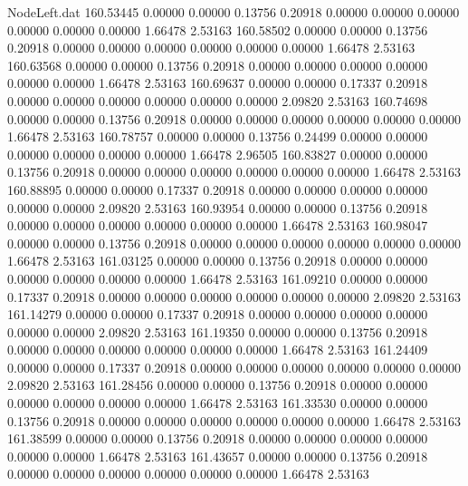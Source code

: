 \begin{filecontents}{NodeLeft.dat}
 160.53445    0.00000    0.00000     0.13756    0.20918    0.00000    0.00000    0.00000    0.00000    0.00000    0.00000    1.66478    2.53163
 160.58502    0.00000    0.00000     0.13756    0.20918    0.00000    0.00000    0.00000    0.00000    0.00000    0.00000    1.66478    2.53163
 160.63568    0.00000    0.00000     0.13756    0.20918    0.00000    0.00000    0.00000    0.00000    0.00000    0.00000    1.66478    2.53163
 160.69637    0.00000    0.00000     0.17337    0.20918    0.00000    0.00000    0.00000    0.00000    0.00000    0.00000    2.09820    2.53163
 160.74698    0.00000    0.00000     0.13756    0.20918    0.00000    0.00000    0.00000    0.00000    0.00000    0.00000    1.66478    2.53163
 160.78757    0.00000    0.00000     0.13756    0.24499    0.00000    0.00000    0.00000    0.00000    0.00000    0.00000    1.66478    2.96505
 160.83827    0.00000    0.00000     0.13756    0.20918    0.00000    0.00000    0.00000    0.00000    0.00000    0.00000    1.66478    2.53163
 160.88895    0.00000    0.00000     0.17337    0.20918    0.00000    0.00000    0.00000    0.00000    0.00000    0.00000    2.09820    2.53163
 160.93954    0.00000    0.00000     0.13756    0.20918    0.00000    0.00000    0.00000    0.00000    0.00000    0.00000    1.66478    2.53163
 160.98047    0.00000    0.00000     0.13756    0.20918    0.00000    0.00000    0.00000    0.00000    0.00000    0.00000    1.66478    2.53163
 161.03125    0.00000    0.00000     0.13756    0.20918    0.00000    0.00000    0.00000    0.00000    0.00000    0.00000    1.66478    2.53163
 161.09210    0.00000    0.00000     0.17337    0.20918    0.00000    0.00000    0.00000    0.00000    0.00000    0.00000    2.09820    2.53163
 161.14279    0.00000    0.00000     0.17337    0.20918    0.00000    0.00000    0.00000    0.00000    0.00000    0.00000    2.09820    2.53163
 161.19350    0.00000    0.00000     0.13756    0.20918    0.00000    0.00000    0.00000    0.00000    0.00000    0.00000    1.66478    2.53163
 161.24409    0.00000    0.00000     0.17337    0.20918    0.00000    0.00000    0.00000    0.00000    0.00000    0.00000    2.09820    2.53163
 161.28456    0.00000    0.00000     0.13756    0.20918    0.00000    0.00000    0.00000    0.00000    0.00000    0.00000    1.66478    2.53163
 161.33530    0.00000    0.00000     0.13756    0.20918    0.00000    0.00000    0.00000    0.00000    0.00000    0.00000    1.66478    2.53163
 161.38599    0.00000    0.00000     0.13756    0.20918    0.00000    0.00000    0.00000    0.00000    0.00000    0.00000    1.66478    2.53163
 161.43657    0.00000    0.00000     0.13756    0.20918    0.00000    0.00000    0.00000    0.00000    0.00000    0.00000    1.66478    2.53163

\end{filecontents}
